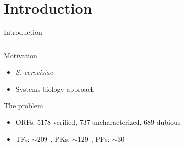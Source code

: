 \section{Introduction}
\begin{frame}{Introduction}
\begin{columns}
\begin{column}{0.5\textwidth}
Motivation
\begin{itemize}
    \item \textit{S. cerevisiae}
    \item Systems biology approach
\end{itemize}

The problem
\begin{itemize}
    \item ORFs: 5178 verified, 737 uncharacterized, 689 dubious~\cite{YeastOverview}
    \item TFs: $\sim209$~\cite{Hughes2013}, PKs: $\sim129$~\cite{Rubenstein2007}, PPs: $\sim30$~\cite{Breitkreutz2010}


\end{itemize}
\end{column}
\end{columns}
\end{frame}
